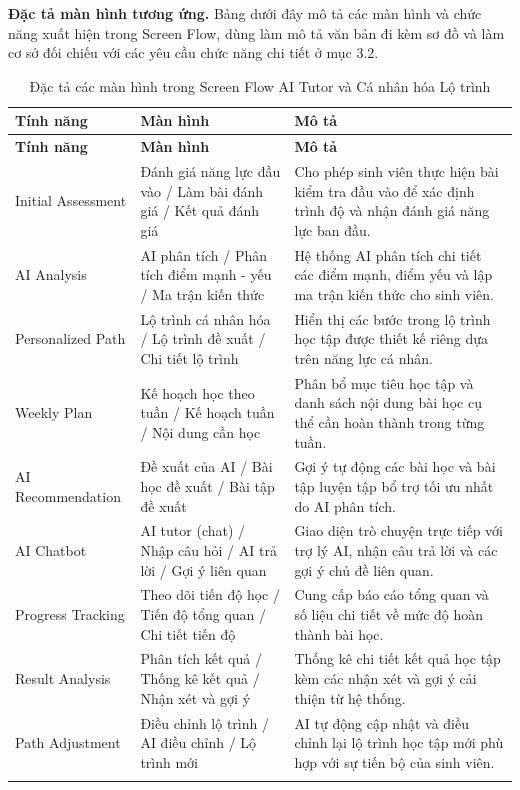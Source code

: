 \documentclass[12pt,a4paper,oneside]{report}
\begin{document}
\noindent\textbf{Đặc tả màn hình tương ứng.} Bảng dưới đây mô tả các màn hình và chức năng xuất hiện trong Screen Flow, dùng làm mô tả văn bản đi kèm sơ đồ và làm cơ sở đối chiếu với các yêu cầu chức năng chi tiết ở mục 3.2.

\renewcommand{\arraystretch}{1.12}
\begin{longtable}{|p{3.0cm}|p{4.1cm}|p{7.0cm}|}
\hline
\rowcolor{orange!15}
\textbf{Tính năng} & \textbf{Màn hình} & \textbf{Mô tả} \\ \hline
\endfirsthead
\hline
\rowcolor{orange!15}
\textbf{Tính năng} & \textbf{Màn hình} & \textbf{Mô tả} \\ \hline
\endhead
Initial Assessment & Đánh giá năng lực đầu vào / Làm bài đánh giá / Kết quả đánh giá & Cho phép sinh viên thực hiện bài kiểm tra đầu vào để xác định trình độ và nhận đánh giá năng lực ban đầu. \\ \hline
AI Analysis & AI phân tích / Phân tích điểm mạnh - yếu / Ma trận kiến thức & Hệ thống AI phân tích chi tiết các điểm mạnh, điểm yếu và lập ma trận kiến thức cho sinh viên. \\ \hline
Personalized Path & Lộ trình cá nhân hóa / Lộ trình đề xuất / Chi tiết lộ trình & Hiển thị các bước trong lộ trình học tập được thiết kế riêng dựa trên năng lực cá nhân. \\ \hline
Weekly Plan & Kế hoạch học theo tuần / Kế hoạch tuần / Nội dung cần học & Phân bổ mục tiêu học tập và danh sách nội dung bài học cụ thể cần hoàn thành trong từng tuần. \\ \hline
AI Recommendation & Đề xuất của AI / Bài học đề xuất / Bài tập đề xuất & Gợi ý tự động các bài học và bài tập luyện tập bổ trợ tối ưu nhất do AI phân tích. \\ \hline
AI Chatbot & AI tutor (chat) / Nhập câu hỏi / AI trả lời / Gợi ý liên quan & Giao diện trò chuyện trực tiếp với trợ lý AI, nhận câu trả lời và các gợi ý chủ đề liên quan. \\ \hline
Progress Tracking & Theo dõi tiến độ học / Tiến độ tổng quan / Chi tiết tiến độ & Cung cấp báo cáo tổng quan và số liệu chi tiết về mức độ hoàn thành bài học. \\ \hline
Result Analysis & Phân tích kết quả / Thống kê kết quả / Nhận xét và gợi ý & Thống kê chi tiết kết quả học tập kèm các nhận xét và gợi ý cải thiện từ hệ thống. \\ \hline
Path Adjustment & Điều chỉnh lộ trình / AI điều chỉnh / Lộ trình mới & AI tự động cập nhật và điều chỉnh lại lộ trình học tập mới phù hợp với sự tiến bộ của sinh viên. \\ \hline
\caption{Đặc tả các màn hình trong Screen Flow AI Tutor và Cá nhân hóa Lộ trình}
\end{longtable}
\clearpage
\end{document}
